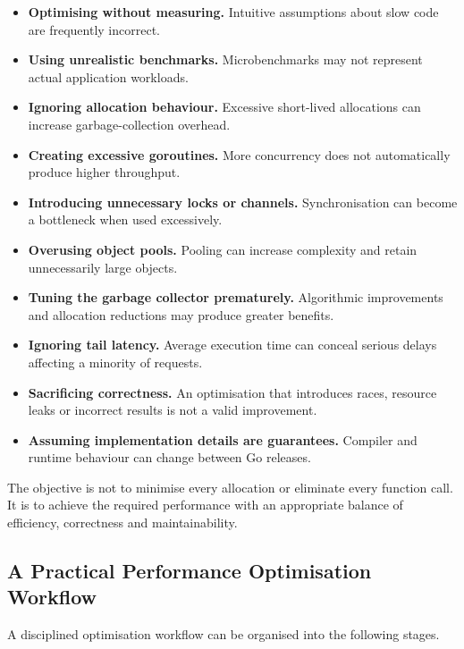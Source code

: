 \begin{itemize}
    \item \textbf{Optimising without measuring.} Intuitive assumptions about slow code are frequently incorrect.
    \item \textbf{Using unrealistic benchmarks.} Microbenchmarks may not represent actual application workloads.
    \item \textbf{Ignoring allocation behaviour.} Excessive short-lived allocations can increase garbage-collection overhead.
    \item \textbf{Creating excessive goroutines.} More concurrency does not automatically produce higher throughput.
    \item \textbf{Introducing unnecessary locks or channels.} Synchronisation can become a bottleneck when used excessively.
    \item \textbf{Overusing object pools.} Pooling can increase complexity and retain unnecessarily large objects.
    \item \textbf{Tuning the garbage collector prematurely.} Algorithmic improvements and allocation reductions may produce greater benefits.
    \item \textbf{Ignoring tail latency.} Average execution time can conceal serious delays affecting a minority of requests.
    \item \textbf{Sacrificing correctness.} An optimisation that introduces races, resource leaks or incorrect results is not a valid improvement.
    \item \textbf{Assuming implementation details are guarantees.} Compiler and runtime behaviour can change between Go releases.
\end{itemize}

The objective is not to minimise every allocation or eliminate every function call. It is to achieve the required performance with an appropriate balance of efficiency, correctness and maintainability.

\subsection{A Practical Performance Optimisation Workflow}

A disciplined optimisation workflow can be organised into the following stages.

